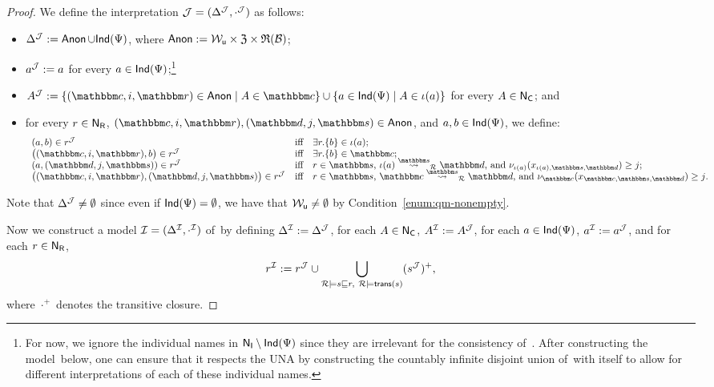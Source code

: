 \begin{proof}
    We define the interpretation $\mathcal{J}=(\Delta^\mathcal{J},\cdot^\mathcal{J})$ as follows:
    \begin{itemize}
        \item $\Delta^\mathcal{J}:=\operatorname{\mathsf{Anon}}\cup\mathsf{Ind}(\Psi)$, where
            $\operatorname{\mathsf{Anon}}:=\mathcal{W}_{\mathsf{u}}\times\mathfrak{Z}\times\mathfrak{R}(\mathcal{B})$;
        \item $a^\mathcal{J}:=a$ for every $a\in\mathsf{Ind}(\Psi)$;\footnote{%
                For now, we ignore the individual names in
                $\mathsf{N_I}\setminus\mathsf{Ind}(\Psi)$ since they are irrelevant for the
                consistency of~\Bmc.  After constructing the model~\Imc below,
                one can ensure that it respects the UNA by constructing the
                countably infinite disjoint union of~\Imc with itself to allow
                for different interpretations of each of these individual names.}
        \item $A^\Jmc:=\{(\cbb,i,\rbb)\in\Anon\mid A\in\cbb\}\cup\{a\in\Ind(\Psi)\mid A\in\iota(a)\}$
            for every $A\in\mathsf{N_C}$; and
        \item for every $r\in\mathsf{N_R}$, $(\cbb,i,\rbb),(\dbb,j,\sbb)\in\Anon$, and
            $a,b\in\mathsf{Ind}(\Psi)$, we define:
            \[\begin{array}{lcl}
                (a,b)\in r^\Jmc
                    &\text{iff}
                    &\text{$\exists r.\{b\}\in\iota(a)$;}\\
                \bigl((\cbb,i,\rbb),b\bigr)\in r^\Jmc
                    &\text{iff}
                    &\text{$\exists r.\{b\}\in\cbb$;}\\
                (a,(\dbb,j,\sbb))\in r^\Jmc
                    &\text{iff}
                    &\text{$r\in\sbb$, $\rcomp{\iota(a)}{\dbb}{\sbb}{\Rmc}$, and
                        $\nu_{\iota(a)}(x_{\iota(a),\sbb,\dbb})\ge j$;}\\
                \bigl((\cbb,i,\rbb),(\dbb,j,\sbb)\bigr)\in r^\Jmc
                    &\text{iff}
                    &\text{$r\in\sbb$, $\rcomp{\cbb}{\dbb}{\sbb}{\Rmc}$, and
                        $\nu_{\cbb}(x_{\cbb,\sbb,\dbb})\ge j$.}
            \end{array}\]
    \end{itemize}
    Note that $\Delta^\mathcal{J}\ne\emptyset$ since even if $\mathsf{Ind}(\Psi)=\emptyset$, we
    have that $\mathcal{W}_{\mathsf{u}}\ne\emptyset$ by Condition~\ref{enum:qm-nonempty}.

    Now we construct a model $\mathcal{I}=(\Delta^\mathcal{I},\cdot^\mathcal{I})$ of~\Bmc by defining
    $\Delta^\mathcal{I}:=\Delta^\mathcal{J}$, for each $A\in\mathsf{N_C}$, $A^\mathcal{I}:=A^\mathcal{J}$, for each
    $a\in\mathsf{Ind}(\Psi)$, $a^\mathcal{I}:=a^\mathcal{J}$, and for each $r\in\mathsf{N_R}$,
    \[r^\mathcal{I}:=r^\mathcal{J}\cup\bigcup_{\mathcal{R}\models s\sqsubseteq r,\ \mathcal{R}\models\mathsf{trans}(s)}(s^\mathcal{J})^+,\]
    where $\cdot^+$ denotes the transitive closure.


\end{proof}
